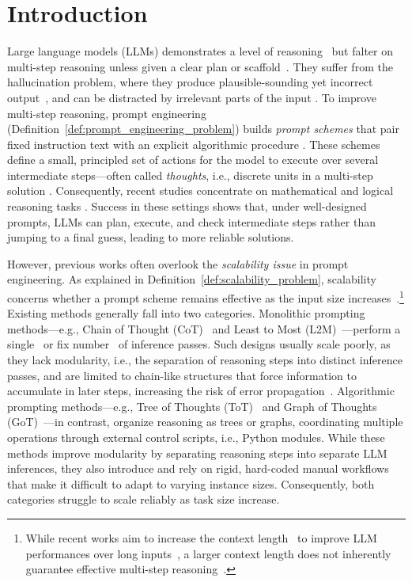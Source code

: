 \section{Introduction}
Large language models (LLMs) demonstrates a level of reasoning~\citep{qiao2023reasoning} but falter on multi-step reasoning unless given a clear plan or scaffold~\citep{wei2022chain}. They suffer from the hallucination problem, where they produce plausible-sounding yet incorrect output~\citep{huang2025survey}, and can be distracted by irrelevant parts of the input \citep{freda2023distracted}. To improve multi-step reasoning, prompt engineering (Definition~\ref{def:prompt_engineering_problem}) builds \emph{prompt schemes} that pair fixed instruction text with an explicit algorithmic procedure \citep{liu2023pre}. These schemes define a small, principled set of actions for the model to execute over several intermediate steps—often called \emph{thoughts}, i.e., discrete units in a multi-step solution \citep{wei2022chain, besta2024graph, besta2024demystifying}. Consequently, recent studies concentrate on mathematical and logical reasoning tasks \citep{zhou2023leasttomost, shin2025enhancing}. Success in these settings shows that, under well-designed prompts, LLMs can plan, execute, and check intermediate steps rather than jumping to a final guess, leading to more reliable solutions.

However, previous works often overlook the \textit{scalability issue} in prompt engineering. As explained in Definition~\ref{def:scalability_problem}, scalability concerns whether a prompt scheme remains effective as the input size increases~\citep{chen2025survey}.\footnote{While recent works aim to increase the context length~\citep{chen2023extending, chen2024clex, ding2024longrope} to improve LLM performances over long inputs~\citep{levy2024same}, a larger context length does not inherently guarantee effective multi-step reasoning~\citep{liu2024lost}.} Existing methods generally fall into two categories. Monolithic prompting methods---e.g., Chain of Thought (CoT)~\citep{wei2022chain} and Least to Most (L2M)~\citep{zhou2023leasttomost}---perform a single~\citep{wei2022chain, kojima2022large, wang2023plan} or fix number~\citep{wang2022self, zhou2024self, dua2022successive, zhou2023leasttomost} of inference passes. Such designs usually scale poorly, as they lack modularity, i.e., the separation of reasoning steps into distinct inference passes, and are limited to chain-like structures that force information to accumulate in later steps, increasing the risk of error propagation~\citep{besta2024demystifying}. Algorithmic prompting methods---e.g., Tree of Thoughts (ToT)~\citep{yao2024tree} and Graph of Thoughts (GoT)~\citep{besta2024graph}---in contrast, organize reasoning as trees
or graphs,
coordinating multiple operations through external control scripts, i.e., Python modules. While these methods improve modularity by separating reasoning steps into separate LLM inferences, they also introduce and rely on rigid, hard-coded manual workflows that make it difficult to adapt to varying instance sizes. Consequently, both categories struggle to scale reliably as task size increase.


